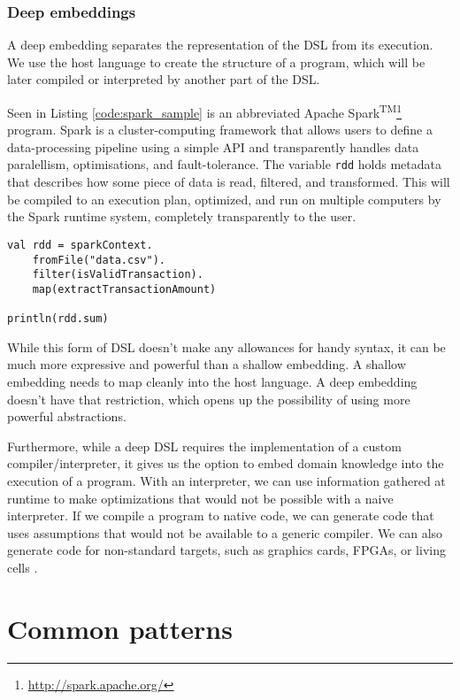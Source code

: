 \subsubsection{Deep embeddings}

A deep embedding separates the representation of the DSL from its execution.
We use the host language to create the structure of a program, which will be later compiled or interpreted by another part of the DSL.

Seen in Listing \ref{code:spark_sample} is an abbreviated Apache Spark\textsuperscript{TM}\footnote{\url{http://spark.apache.org/}} program.
Spark is a cluster-computing framework that allows users to define a data-processing pipeline using a simple API and transparently handles data paralellism, optimisations, and fault-tolerance.
The variable \texttt{rdd} holds metadata that describes how some piece of data is read, filtered, and transformed.
This will be compiled to an execution plan, optimized, and run on multiple computers by the Spark runtime system, completely transparently to the user.

\begin{lstlisting}[caption=Sample spark code, label=code:spark_sample]
val rdd = sparkContext.
	fromFile("data.csv").
	filter(isValidTransaction).
	map(extractTransactionAmount)

println(rdd.sum)
\end{lstlisting}

While this form of DSL doesn't make any allowances for handy syntax, it can be much more expressive and powerful than a shallow embedding.
A shallow embedding needs to map cleanly into the host language.
A deep embedding doesn't have that restriction, which opens up the possibility of using more powerful abstractions.

Furthermore, while a deep DSL requires the implementation of a custom compiler/interpreter, it gives us the option to embed domain knowledge into the execution of a program.
With an interpreter, we can use information gathered at runtime to make optimizations that would not be possible with a naive interpreter.
If we compile a program to native code, we can generate code that uses assumptions that would not be available to a generic compiler.
We can also generate code for non-standard targets, such as graphics cards, FPGAs, or living cells \autocite{Pedersen:2009}.

\section{Common patterns}

